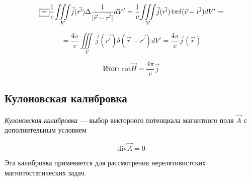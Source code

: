 \[
\fbox{=}\frac{1}{c}\underset{V}{\iiint}\vec{j}(\vec{r'})\Delta \frac{1}{|\vec{r}-\vec{r'}|}dV'=\frac{1}{c}\underset{V}{\iiint}\vec{j}(\vec{r'})4\pi\delta(\vec{r}-\vec{r'})dV' = 
\]

\[
=\frac{4\pi}{c}\underset{V}{\iiint}\vec{j}(\vec{r'})\delta (\vec{r}-\vec{r'})dV'=\frac{4\pi}{c}\vec{j}(\vec{r})  
\]

\[
\text{Итог: } \boxed{\mathrm{rot}\vec{H}=\frac{4\pi}{c}\vec{j}  }
\]

\subsection*{Кулоновская калибровка}

\textit{Кулоновская калибровка} — выбор векторного потенциала магнитного поля $\vec{A}$ с дополнительным условием

\[
\mathrm{div}\vec{A}=0 
\]

Эта калибровка применяется для рассмотрения нерелятивистских магнитостатических задач.